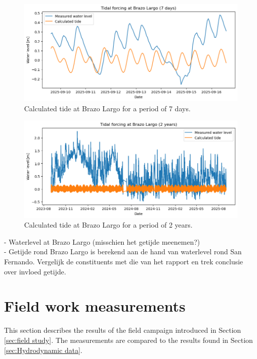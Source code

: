 \begin{figure}[H]
    \centering
    \includegraphics[width=1\linewidth]{figures/ch5/Tide_Brazo_largo.png}
    \caption{Calculated tide at Brazo Largo for a period of 7 days.}
    \label{fig:period 7}
\end{figure}
\begin{figure}[H]
    \centering
    \includegraphics[width=1\linewidth]{figures/ch5/Tide_BL_2y.png}
    \caption{Calculated tide at Brazo Largo for a period of 2 years.}
    \label{fig:period 2}
\end{figure}

- Waterlevel at Brazo Largo
    (misschien het getijde meenemen?)
\\ - Getijde rond Brazo Largo is berekend aan de hand van waterlevel rond San Fernando. Vergelijk de constituents met die van  het rapport en trek conclusie over invloed getijde.



\section{Field work measurements}
This section describes the results of the field campaign introduced in Section \ref{sec:field study}. The measurements are compared to the results found in Section \ref{sec:Hydrodynamic data}.


